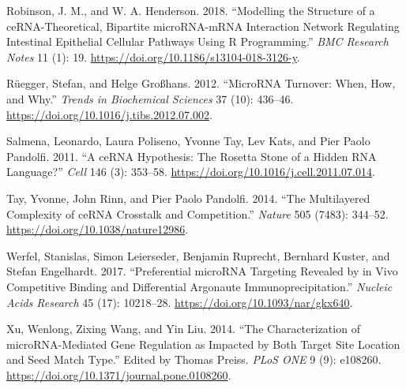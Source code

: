 \documentclass[]{article}
\begin{document}
\leavevmode\hypertarget{ref-robinson_modelling_2018}{}%
Robinson, J. M., and W. A. Henderson. 2018. ``Modelling the Structure of
a ceRNA-Theoretical, Bipartite microRNA-mRNA Interaction Network
Regulating Intestinal Epithelial Cellular Pathways Using R
Programming.'' \emph{BMC Research Notes} 11 (1): 19.
\url{https://doi.org/10.1186/s13104-018-3126-y}.

\leavevmode\hypertarget{ref-ruegger_microrna_2012}{}%
Rüegger, Stefan, and Helge Großhans. 2012. ``MicroRNA Turnover: When,
How, and Why.'' \emph{Trends in Biochemical Sciences} 37 (10): 436--46.
\url{https://doi.org/10.1016/j.tibs.2012.07.002}.

\leavevmode\hypertarget{ref-salmena_cerna_2011}{}%
Salmena, Leonardo, Laura Poliseno, Yvonne Tay, Lev Kats, and Pier Paolo
Pandolfi. 2011. ``A ceRNA Hypothesis: The Rosetta Stone of a Hidden RNA
Language?'' \emph{Cell} 146 (3): 353--58.
\url{https://doi.org/10.1016/j.cell.2011.07.014}.

\leavevmode\hypertarget{ref-tay_multilayered_2014}{}%
Tay, Yvonne, John Rinn, and Pier Paolo Pandolfi. 2014. ``The
Multilayered Complexity of ceRNA Crosstalk and Competition.''
\emph{Nature} 505 (7483): 344--52.
\url{https://doi.org/10.1038/nature12986}.

\leavevmode\hypertarget{ref-werfel_preferential_2017}{}%
Werfel, Stanislas, Simon Leierseder, Benjamin Ruprecht, Bernhard Kuster,
and Stefan Engelhardt. 2017. ``Preferential microRNA Targeting Revealed
by in Vivo Competitive Binding and Differential Argonaute
Immunoprecipitation.'' \emph{Nucleic Acids Research} 45 (17): 10218--28.
\url{https://doi.org/10.1093/nar/gkx640}.

\leavevmode\hypertarget{ref-xu_characterization_2014}{}%
Xu, Wenlong, Zixing Wang, and Yin Liu. 2014. ``The Characterization of
microRNA-Mediated Gene Regulation as Impacted by Both Target Site
Location and Seed Match Type.'' Edited by Thomas Preiss. \emph{PLoS ONE}
9 (9): e108260. \url{https://doi.org/10.1371/journal.pone.0108260}.
\end{document}
